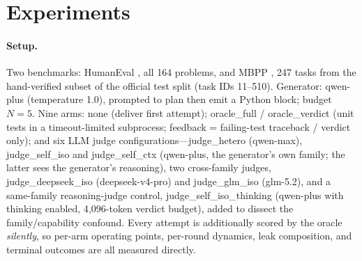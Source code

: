 \documentclass[10pt]{article}
\begin{document}
\section{Experiments}\label{sec:exp}

\paragraph{Setup.}
Two benchmarks: HumanEval \citep{chen2021humaneval}, all 164
problems, and MBPP \citep{austin2021mbpp}, 247 tasks from the
hand-verified subset of the official test split (task IDs
11--510).  Generator: qwen-plus (temperature 1.0), prompted to
plan then emit a Python block; budget $N{=}5$.  Nine arms:
\textsf{none} (deliver first attempt); \textsf{oracle\_full} /
\textsf{oracle\_verdict} (unit tests in a timeout-limited
subprocess; feedback = failing-test traceback / verdict only); and
six LLM judge configurations---\textsf{judge\_hetero} (qwen-max),
\textsf{judge\_self\_iso} and \textsf{judge\_self\_ctx} (qwen-plus,
the generator's own family; the latter sees the generator's
reasoning), two cross-family judges,
\textsf{judge\_deepseek\_iso} (deepseek-v4-pro) and
\textsf{judge\_glm\_iso} (glm-5.2), and a same-family
reasoning-judge control, \textsf{judge\_self\_iso\_thinking}
(qwen-plus with thinking enabled, 4{,}096-token verdict budget),
added to dissect the family/capability confound.  Every attempt is
additionally
scored by the oracle \emph{silently}, so per-arm operating points,
per-round dynamics, leak composition, and terminal outcomes are
all measured directly.
\end{document}
